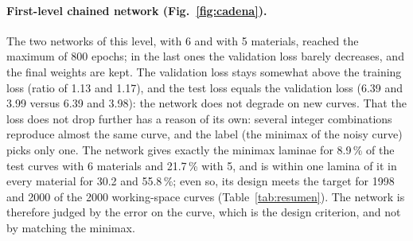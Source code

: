 \begin{table}[H]\centering\small
\caption{Training summary. Epochs: total run and epoch whose weights are kept. Loss without the L2 term, computed with the kept weights; both networks use the binary cross-entropy summed over the questions and the materials (in nats); the tube network also adds 5 times the mean squared error of the standardized $\delta$, which is below 0.02. The last column is the test loss divided by the training loss.}\label{tab:entrenamiento}
\end{table}

\paragraph{First-level chained network (Fig.~\ref{fig:cadena}).} The two networks of this level, with 6 and with 5 materials, reached the maximum of 800 epochs; in the last ones the validation loss barely decreases, and the final weights are kept. The validation loss stays somewhat above the training loss (ratio of 1.13 and 1.17), and the test loss equals the validation loss (6.39 and 3.99 versus 6.39 and 3.98): the network does not degrade on new curves. That the loss does not drop further has a reason of its own: several integer combinations reproduce almost the same curve, and the label (the minimax of the noisy curve) picks only one. The network gives exactly the minimax laminae for 8.9\,\% of the test curves with 6 materials and 21.7\,\% with 5, and is within one lamina of it in every material for 30.2 and 55.8\,\%; even so, its design meets the target for 1998 and 2000 of the 2000 working-space curves (Table~\ref{tab:resumen}). The network is therefore judged by the error on the curve, which is the design criterion, and not by matching the minimax.

